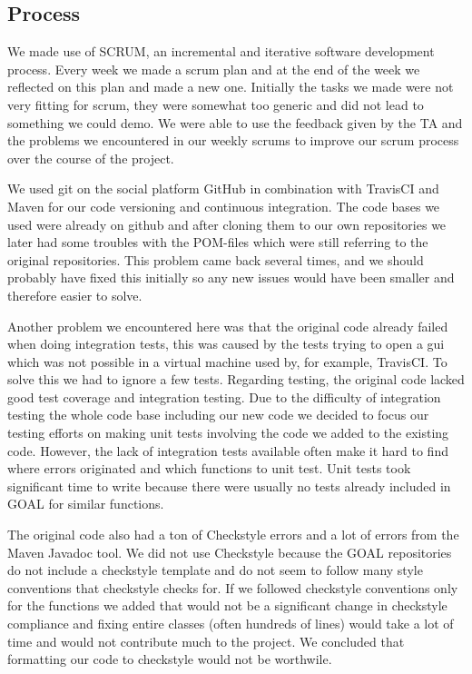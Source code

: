 \documentclass[11pt]{article}
\begin{document}
\subsection{Process}
We made use of \gls{SCRUM}, an incremental and iterative software development process. Every week we made a scrum plan and at the end of the week we reflected on this plan and made a new one. Initially the tasks we made were not very fitting for scrum, they were somewhat too generic and did not lead to something we could demo. We were able to use the feedback given by the TA and the problems we encountered in our weekly scrums to improve our scrum process over the course of the project. \par 
We used git\cite{git} on the social platform GitHub\cite{GitHub} in combination with TravisCI\cite{TravisCI} and Maven\cite{Maven} for our code versioning and continuous integration. The code bases we used were already on github and after cloning them to our own repositories we later had some troubles with the POM-files which were still referring to the original repositories. This problem came back several times, and we should probably have fixed this initially so any new issues would have been smaller and therefore easier to solve. \par 
Another problem we encountered here was that the original code already failed when doing integration tests, this was caused by the tests trying to open a gui which was not possible in a virtual machine used by, for example, \gls{TravisCI}. To solve this we had to ignore a few tests. Regarding testing, the original code lacked good test coverage and integration testing. Due to the difficulty of integration testing the whole code base including our new code we decided to focus our testing efforts on making unit tests involving the code we added to the existing code. However, the lack of integration tests available often make it hard to find where errors originated and which functions to unit test. Unit tests took significant time to write because there were usually no tests already included in GOAL for similar functions. \par 
The original code also had a ton of Checkstyle errors and a lot of errors from the Maven Javadoc tool. We did not use Checkstyle because the GOAL repositories do not include a checkstyle template and do not seem to follow many style conventions that checkstyle checks for. If we followed checkstyle conventions only for the functions we added that would not be a significant change in checkstyle compliance and fixing entire classes (often hundreds of lines) would take a lot of time and would not contribute much to the project. We concluded that formatting our code to checkstyle would not be worthwile.\\
\end{document}
